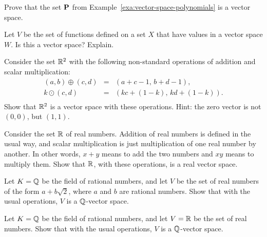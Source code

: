 \begin{ex}
  Prove that the set $\mathbf{P}$ from
  Example~\ref{exa:vector-space-polynomials} is a vector space.
\end{ex}

\begin{ex}
  Let $V$ be the set of functions defined on a set $X$ that have
  values in a vector space $W$. Is this a vector space? Explain.
\end{ex}

\begin{ex}
  Consider the set $\mathbb{R}^{2}$ with the following non-standard operations
  of addition and scalar multiplication:
  \begin{equation*}
    \begin{array}{rcl}
      (a,b) \oplus (c,d) &=& (a+c-1,\, b+d-1), \\
      k \odot (c,d) &=& (kc + (1-k),\, kd + (1-k)). \\
    \end{array}
  \end{equation*}
  Show that $\mathbb{R}^2$ is a vector space with these operations. Hint: the
  zero vector is not $(0,0)$, but $(1,1)$.
\end{ex}

\begin{ex}
  Consider the set $\mathbb{R}$ of real numbers. Addition of real numbers is
  defined in the usual way, and scalar multiplication is just
  multiplication of one real number by another. In other words, $x+y$
  means to add the two numbers and $xy$ means to multiply them. Show
  that $\mathbb{R}$, with these operations, is a real vector space.
\end{ex}

\begin{ex}
  Let $K=\mathbb{Q}$ be the field of rational numbers, and let $V$ be the set
  of real numbers of the form $a+b\sqrt{2}$, where $a$ and $b$ are
  rational numbers. Show that with the usual operations, $V$ is a
  $\mathbb{Q}$-vector space.
\end{ex}

\begin{ex}
  Let $K=\mathbb{Q}$ be the field of rational numbers, and let $V=\mathbb{R}$ be the
  set of real numbers. Show that with the usual operations, $V$ is a
  $\mathbb{Q}$-vector space.
\end{ex}

